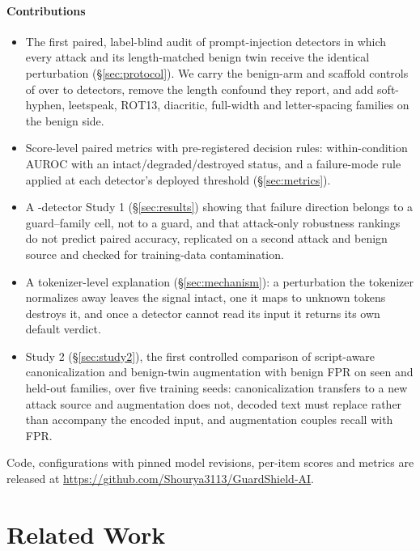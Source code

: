 \documentclass[conference]{IEEEtran}
\begin{document}
\paragraph{Contributions}
\begin{itemize}
  \item The first paired, label-blind audit of prompt-injection detectors in which every attack and its length-matched benign twin receive the identical perturbation (\S\ref{sec:protocol}). We carry the benign-arm and scaffold controls of \citet{zhang2026refusing} over to detectors, remove the length confound they report, and add soft-hyphen, leetspeak, ROT13, diacritic, full-width and letter-spacing families on the benign side.
  \item Score-level paired metrics with pre-registered decision rules: within-condition AUROC with an intact/degraded/destroyed status, and a failure-mode rule applied at each detector's deployed threshold (\S\ref{sec:metrics}).
  \item A \nGuards{}-detector Study 1 (\S\ref{sec:results}) showing that failure direction belongs to a guard--family cell, not to a guard, and that attack-only robustness rankings do not predict paired accuracy, replicated on a second attack and benign source and checked for training-data contamination.
  \item A tokenizer-level explanation (\S\ref{sec:mechanism}): a perturbation the tokenizer normalizes away leaves the signal intact, one it maps to unknown tokens destroys it, and once a detector cannot read its input it returns its own default verdict.
  \item Study 2 (\S\ref{sec:study2}), the first controlled comparison of script-aware canonicalization and benign-twin augmentation with benign FPR on seen and held-out families, over five training seeds: canonicalization transfers to a new attack source and augmentation does not, decoded text must replace rather than accompany the encoded input, and augmentation couples recall with FPR.
\end{itemize}
Code, configurations with pinned model revisions, per-item scores and metrics are released at \url{https://github.com/Shourya3113/GuardShield-AI}.

\section{Related Work}
\end{document}
